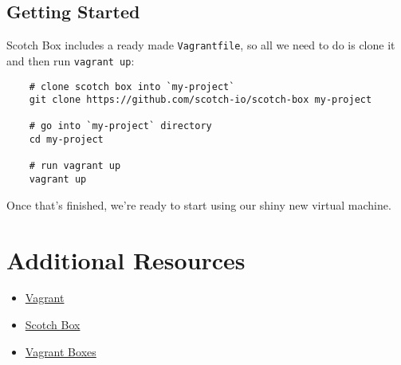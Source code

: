 \subsection{Getting Started}

Scotch Box includes a ready made \texttt{Vagrantfile}, so all we need to do is clone it and then run \texttt{vagrant up}:

\begin{verbatim}
    # clone scotch box into `my-project`
    git clone https://github.com/scotch-io/scotch-box my-project

    # go into `my-project` directory
    cd my-project

    # run vagrant up
    vagrant up
\end{verbatim}

Once that's finished, we're ready to start using our shiny new virtual machine.

\section{Additional Resources}

\begin{itemize}[leftmargin=*]
    \item \href{https://www.vagrantup.com}{Vagrant}
    \item \href{https://box.scotch.io}{Scotch Box}
    \item \href{https://app.vagrantup.com/boxes/search}{Vagrant Boxes}
\end{itemize}